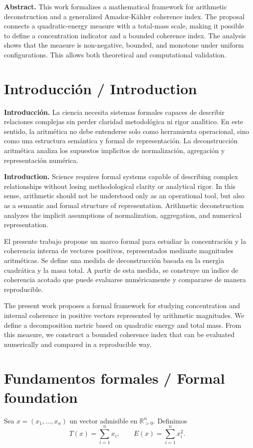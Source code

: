 \documentclass[11pt]{article}
\begin{document}
\textbf{Abstract.} This work formalizes a mathematical framework for arithmetic deconstruction and a generalized Amador-K\"ahler coherence index. The proposal connects a quadratic-energy measure with a total-mass scale, making it possible to define a concentration indicator and a bounded coherence index. The analysis shows that the measure is non-negative, bounded, and monotone under uniform configurations. This allows both theoretical and computational validation.

\section*{Introducci\'on / Introduction}
\textbf{Introducci\'on.} La ciencia necesita sistemas formales capaces de describir relaciones complejas sin perder claridad metodol\'ogica ni rigor anal\'{\i}tico. En este sentido, la aritm\'etica no debe entenderse solo como herramienta operacional, sino como una estructura sem\'antica y formal de representaci\'on. La deconstrucci\'on aritm\'etica analiza los supuestos impl\'{\i}citos de normalizaci\'on, agregaci\'on y representaci\'on num\'erica.

\textbf{Introduction.} Science requires formal systems capable of describing complex relationships without losing methodological clarity or analytical rigor. In this sense, arithmetic should not be understood only as an operational tool, but also as a semantic and formal structure of representation. Arithmetic deconstruction analyzes the implicit assumptions of normalization, aggregation, and numerical representation.

El presente trabajo propone un marco formal para estudiar la concentraci\'on y la coherencia interna de vectores positivos, representados mediante magnitudes aritm\'eticas. Se define una medida de deconstrucci\'on basada en la energ\'{\i}a cuadr\'atica y la masa total. A partir de esta medida, se construye un \'{\i}ndice de coherencia acotado que puede evaluarse num\'ericamente y compararse de manera reproducible.

The present work proposes a formal framework for studying concentration and internal coherence in positive vectors represented by arithmetic magnitudes. We define a decomposition metric based on quadratic energy and total mass. From this measure, we construct a bounded coherence index that can be evaluated numerically and compared in a reproducible way.

\section{Fundamentos formales / Formal foundation}
Sea $x=(x_1,\ldots,x_n)$ un vector admisible en $\mathbb{R}_{>0}^n$. Definimos
\begin{equation}
T(x)=\sum_{i=1}^{n}x_i, \qquad E(x)=\sum_{i=1}^{n}x_i^2.
\end{equation}
\end{document}
